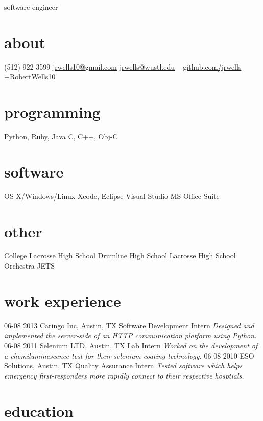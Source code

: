 \documentclass[]{cv}
\begin{document}
       {software engineer}

\begin{aside}
  \section{about}
    (512) 922-3599
    \href{mailto:jrwells10@gmail.com}{jrwells10@gmail.com}
    \href{mailto:jrwells@wustl.edu}{jrwells@wustl.edu}
    ~
    \href{http://github.com/jrwells}{github.com/jrwells}
    \href{http://google.com/+RobertWells10}{+RobertWells10}
  \section{programming}
    Python, Ruby, Java
    C, C++, Obj-C
  \section{software}
    OS X/Windows/Linux
    Xcode, Eclipse
    Visual Studio
    MS Office Suite
  \section{other}
    College Lacrosse
    High School Drumline
    High School Lacrosse
    High School Orchestra
    JETS
\end{aside}

\section{work experience}

\begin{entrylist}
  \entry
    {06-08 2013}
    {Caringo Inc, Austin, TX}
    {Software Development Intern}
    {\emph{Designed and implemented the server-side of an HTTP communication platform using Python.}}
  \entry
    {06-08 2011}
    {Selenium LTD, Austin, TX}
    {Lab Intern}
    {\emph{Worked on the development of a chemiluminescence test for their selenium coating technology.}}
  \entry
    {06-08 2010}
    {ESO Solutions, Austin, TX}
    {Quality Assurance Intern}
    {\emph{Tested software which helps emergency first-responders more rapidly connect to their respective hosptials.}}
\end{entrylist}

\section{education}
\end{document}
